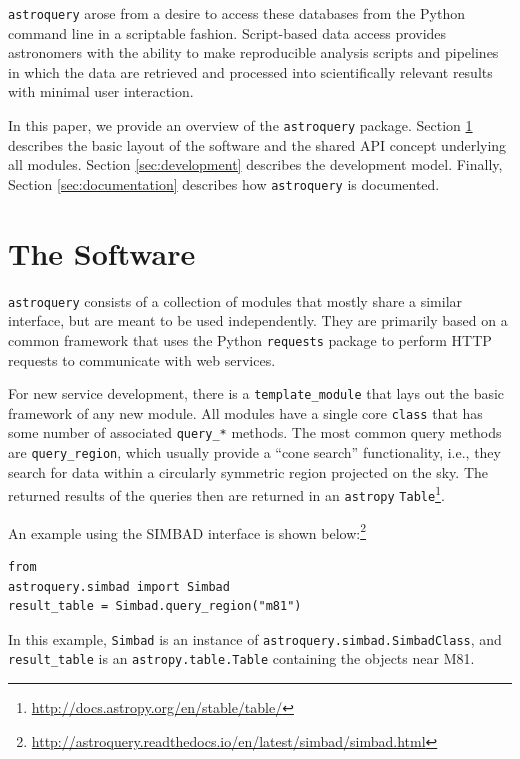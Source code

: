 \documentclass[twocolumn]{aastex62}
\newcommand{\package}[1]{\texttt{#1}\xspace}
\newcommand{\astroquery}{\package{astroquery}}
\newcommand{\astropypkg}{\package{astropy}}
\begin{document}
\astroquery arose from a desire to access these databases from the Python
command line in a scriptable fashion.  Script-based data access provides
astronomers with the ability to make reproducible analysis scripts and
pipelines in which the data are retrieved and processed into scientifically
relevant results with minimal user interaction.

In this paper, we provide an overview of the \astroquery package.  Section
\ref{sec:software} describes the basic layout of the software and the shared
API concept underlying all modules.  Section \ref{sec:development} describes
the development model.  Finally, Section \ref{sec:documentation} describes how
\astroquery is documented.



\section{The Software}
\label{sec:software}
\astroquery consists of a collection of modules that mostly share a similar
interface, but are meant to be used independently.  They are primarily based on
a common framework that uses the Python \package{requests} package to perform
HTTP requests to communicate with web services.

For new service development, there is a \texttt{template\_module} that lays
out the basic framework of any new module.  All modules have a single core
\texttt{class} that has some number of associated \texttt{query\_*} methods.
The most common query methods are \texttt{query\_region}, which usually
provide a ``cone search'' functionality, i.e., they search for data within a
circularly symmetric region projected on the sky. The returned results of
the queries then are returned in an \astropypkg
\citep{Astropy-Collaboration2018, Astropy-Collaboration2013}
\texttt{Table}\footnote{\url{http://docs.astropy.org/en/stable/table/}}.

An example using the SIMBAD interface is shown
below:\footnote{\url{http://astroquery.readthedocs.io/en/latest/simbad/simbad.html}}
\begin{lstlisting}[caption=Query SIMBAD for a region around M81] from
astroquery.simbad import Simbad
result_table = Simbad.query_region("m81")
\end{lstlisting}
In this example, \texttt{Simbad} is an instance of 
\texttt{astroquery.simbad.SimbadClass}, and \texttt{result\_table} is an
\texttt{astropy.table.Table} containing the objects near M81.
\end{document}

